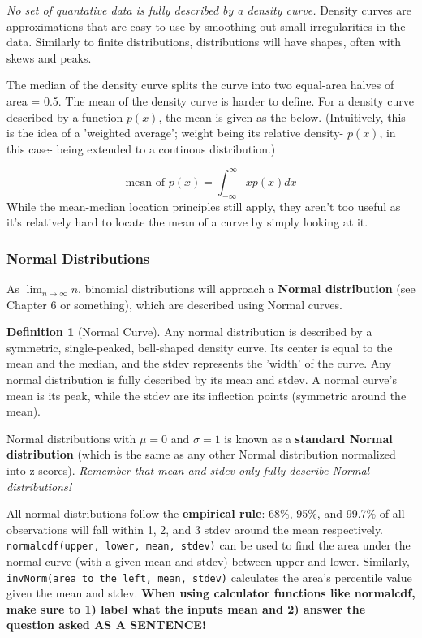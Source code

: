 \documentclass[12pt, a4paper]{article}
\theoremstyle{definition}
\newtheorem{definition}{Definition}
\begin{document}
\textit{No set of quantative data is fully described by a density curve.} Density curves are approximations that are easy to use by smoothing out small irregularities in the data.
Similarly to finite distributions, distributions will have shapes, often with skews and peaks.

The median of the density curve splits the curve into two equal-area halves of area = 0.5.
The mean of the density curve is harder to define. For a density curve described by a function $p(x)$, the mean is given as the below.
(Intuitively, this is the idea of a 'weighted average'; weight being its relative density- $p(x)$, in this case- being extended to a continous distribution.)

\[\textrm{mean of $p(x)$} = \int_{-\infty}^{\infty}xp(x)dx\]
While the mean-median location principles still apply, they aren't too useful as it's relatively hard to locate the mean of a curve by simply looking at it.

\subsubsection{Normal Distributions}
As $\lim_{n\to\infty} n$, binomial distributions will approach a \textbf{Normal distribution} (see Chapter 6 or something), which are described using Normal curves.

\begin{definition}[Normal Curve]
    Any normal distribution is described by a symmetric, single-peaked, bell-shaped density curve. Its center is equal to the mean and the median, and the stdev represents the 'width' of the curve.
    Any normal distribution is fully described by its mean and stdev. A normal curve's mean is its peak, while the stdev are its inflection points (symmetric around the mean).

    Normal distributions with $\mu = 0$ and $\sigma = 1$ is known as a \textbf{standard Normal distribution} (which is the same as any other Normal distribution normalized into z-scores).
    \textit{Remember that mean and stdev only fully describe Normal distributions!}
\end{definition}

All normal distributions follow the \textbf{empirical rule}: 68\%, 95\%, and 99.7\% of all observations will fall within 1, 2, and 3 stdev around the mean respectively.
\verb|normalcdf(upper, lower, mean, stdev)| can be used to find the area under the normal curve (with a given mean and stdev) between upper and lower.
Similarly, \verb|invNorm(area to the left, mean, stdev)| calculates the area's percentile value given the mean and stdev.
\textbf{When using calculator functions like normalcdf, make sure to 1) label what the inputs mean and 2) answer the question asked AS A SENTENCE!}
\end{document}
